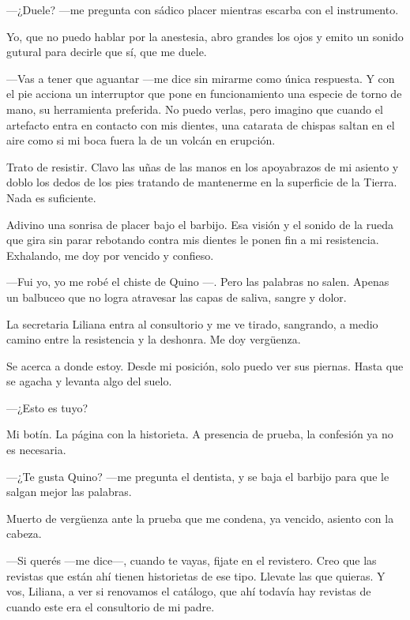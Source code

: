 \documentclass[11pt,twoside,openright]{book}
\begin{document}
 ---¿Duele? ---me pregunta con sádico placer mientras escarba con el
 instrumento.
 
 Yo, que no puedo hablar por la anestesia, abro grandes los ojos y emito un
 sonido gutural para decirle que sí, que me duele.
 
 ---Vas a tener que aguantar ---me dice sin mirarme como única respuesta. Y con
 el pie acciona un interruptor que pone en funcionamiento una especie de torno
 de mano, su herramienta preferida. No puedo verlas, pero imagino que cuando el
 artefacto entra en contacto con mis dientes, una catarata de chispas saltan en
 el aire como si mi boca fuera la de un volcán en erupción.
 
 Trato de resistir. Clavo las uñas de las manos en los apoyabrazos de mi asiento
 y doblo los dedos de los pies tratando de mantenerme en la superficie de la
 Tierra. Nada es suficiente.
 
 Adivino una sonrisa de placer bajo el barbijo. Esa visión y el sonido de la
 rueda que gira sin parar rebotando contra mis dientes le ponen fin a mi
 resistencia. Exhalando, me doy por vencido y confieso.
 
 ---Fui yo, yo me robé el chiste de Quino ---. Pero las palabras no salen.
 Apenas un balbuceo que no logra atravesar las capas de saliva, sangre y dolor.
 
 La secretaria Liliana entra al consultorio y me ve tirado, sangrando, a medio
 camino entre la resistencia y la deshonra. Me doy vergüenza.
 
 Se acerca a donde estoy. Desde mi posición, solo puedo ver sus piernas. Hasta
 que se agacha y levanta algo del suelo.
 
 ---¿Esto es tuyo?
 
 Mi botín. La página con la historieta. A presencia de prueba, la confesión ya
 no es necesaria.
 
 ---¿Te gusta Quino? ---me pregunta el dentista, y se baja el barbijo para que
 le salgan mejor las palabras.
 
 Muerto de vergüenza ante la prueba que me condena, ya vencido, asiento con la
 cabeza.
 
 ---Si querés ---me dice---, cuando te vayas, fijate en el revistero. Creo que
 las revistas que están ahí tienen historietas de ese tipo. Llevate las que
 quieras. Y vos, Liliana, a ver si renovamos el catálogo, que ahí todavía hay
 revistas de cuando este era el consultorio de mi padre.
 
\end{document}
